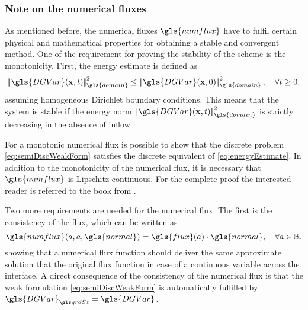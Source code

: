\subsubsection{Note on the numerical fluxes}
As mentioned before, the numerical fluxes $\gls{numflux}$ have to fulfil certain physical and mathematical properties for obtaining a stable and convergent method. One of the requirement for proving the stability of the scheme is the monotonicity. First, the energy estimate is defined as
\begin{equation}
	\norm{\gls{DGVar}(\vectr{x},t)}_{\gls{domain}}^2 \leq \norm{\gls{DGVar}(\vectr{x},0)}_{\gls{domain}}^2, \quad \forall t \geq 0,
	\label{eq:energyEstimate}
\end{equation}
assuming homogeneous Dirichlet boundary conditions. This means that the system is stable if the energy norm $\norm{\gls{DGVar}(\vectr{x},t)}_{\gls{domain}}^2 $ is strictly decreasing in the absence of inflow. 

For a monotonic numerical flux is possible to show that the discrete problem \cref{eq:semiDiscWeakForm} satisfies the discrete equivalent of \cref{eq:energyEstimate}. In addition to the monotonicity of the numerical flux, it is necessary that $\gls{numflux}$ is Lipschitz continuous.%
For the complete proof the interested reader is referred to the book from \textcite{dipietroMathematicalAspectsDiscontinuous2012}.

Two more requirements are needed for the numerical flux. The first is the consistency of the flux, which can be written as
\begin{equation}
	\gls{numflux}(a,a,\gls{normal}) = \gls{flux}(a) \cdot \gls{normal}, \quad \forall a \in \mathbb{R}. 
	\label{eq:consistency}
\end{equation}
showing that a numerical flux function should deliver the same approximate solution that the original flux function in case of a continuous variable across the interface. A direct consequence of the consistency of the numerical flux is that the weak formulation \cref{eq:semiDiscWeakForm} is automatically fulfilled by $\nuM{\gls{DGVar}} = \gls{DGVar}$.

